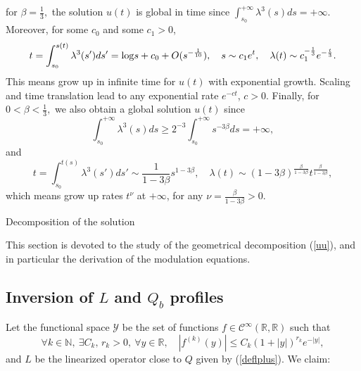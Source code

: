 \documentclass[11pt,a4paper,reqno]{amsart}
\makeatletter
\theoremstyle{remark}
\numberwithin{equation}{section}
\def\section{\@startsection{section}{1}%
  \z@{1.5\linespacing\@plus\linespacing}{.5\linespacing}%
  {\normalfont\bfseries\large\centering}}
\def\fref#1{{\rm (\ref{#1})}}
\def\fref#1{{\rm (\ref{#1})}}
\def\l{\lambda}
\def\log{{\rm log}}
\makeatother
\begin{document}
\medskip

  for $ 
\beta = \frac 13,
$ 
the solution $u(t)$ is global in time since $\int_{s_0}^{+\infty}  {\l^3(s)} ds =+\infty$.
Moreover, for some $c_0$ and some $c_1 >0$,
$$
t=\int_{s_0}^{s(t)}{\l^3(s')}{ds'} 
=  \log s + c_0 +O(s^{-\frac 1{10}}),\quad  s\sim  c_1 e^t  ,\quad
 \l(t)\sim  c_1^{-\frac 13} e^{-\frac t 3}  .
$$
This means grow up in infinite time for $u(t)$ with exponential growth. Scaling and time translation   lead to any exponential rate $e^{-ct}$, $c>0$. Finally, for $0<\beta< \frac 13,$
we also obtain a global solution $u(t)$  since
$$\int_{s_0}^{+\infty} \l^3(s) ds \geq 2^{-3} \int_{s_0}^{+\infty} s^{-3 \beta} ds = +\infty,$$
and 
$$t= \int_{s_0}^{t(s)} \l^3(s') ds' \sim 
\frac 1{1-3 \beta} s^{1-3 \beta}  ,
\quad  \l(t) \sim  (1-3 \beta)^{\frac \beta{1-3 \beta}} t^{\frac \beta{1-3 \beta}}  ,
$$
which means   grow up rates $t^\nu$ at $+\infty$, for any $\nu=\frac {\beta}{1-3\beta}>0$.


\section{Decomposition of the solution}


This section is devoted to the study of the geometrical decomposition \fref{uu}, and in particular the derivation of the modulation equations.


\subsection{Inversion of $L$ and $Q_b$ profiles}
 

Let the functional space
       ${\mathcal Y}$ be the set of functions $f\in \mathcal C^\infty({{\mathbb R}},{{\mathbb R}})$ such that
\begin{equation}\label{Y}
    \forall k\in \mathbb{N},\ \exists C_k,\, r_k>0,\ \forall y\in {{\mathbb R}},\quad |f^{(k)}(y)|\leq C_k (1+|y|)^{r_k} {e^{-|y|}},
\end{equation}
and $L$ be the linearized operator close to $Q$ given by \fref{deflplus}. We claim:
\end{document}
